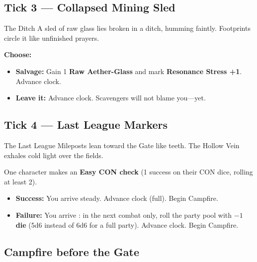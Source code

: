 \subsection{Tick 3 --- Collapsed Mining Sled}

\begin{rpgbox}{The Ditch}
    A sled of raw glass lies broken in a ditch, humming faintly.
    Footprints circle it like unfinished prayers.
\end{rpgbox}

\textbf{Choose:}
\begin{itemize}
    \item \textbf{Salvage:} Gain 1 \textbf{Raw Aether-Glass} and mark \textbf{Resonance Stress +1}. Advance clock.
    \item \textbf{Leave it:} Advance clock. Scavengers will not blame you---yet.
\end{itemize}

\subsection{Tick 4 --- Last League Markers}

\begin{rpgbox}{The Last League}
    Mileposts lean toward the Gate like teeth.
    The Hollow Vein exhales cold light over the fields.
\end{rpgbox}

One character makes an \textbf{Easy CON check} (1 success on their CON dice, rolling at least 2).
\begin{itemize}
    \item \textbf{Success:} You arrive steady. Advance clock (full). Begin Campfire.
    \item \textbf{Failure:} You arrive : in the next combat only, roll the party pool with \textbf{$-1$ die} (5d6 instead of 6d6 for a full party). Advance clock. Begin Campfire.
\end{itemize}

\subsection{Campfire before the Gate}

